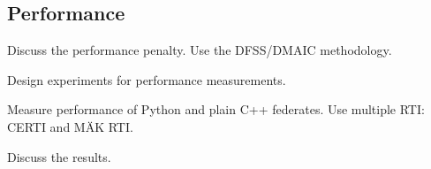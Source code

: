 \documentclass[12pt,a4paper]{howto}
\begin{document}
\subsection{Performance}

Discuss the performance penalty. Use the DFSS/DMAIC methodology.

Design experiments for performance measurements.

Measure performance of Python and plain C++ federates. Use multiple RTI: CERTI and MÄK RTI.

Discuss the results.





\end{document}
